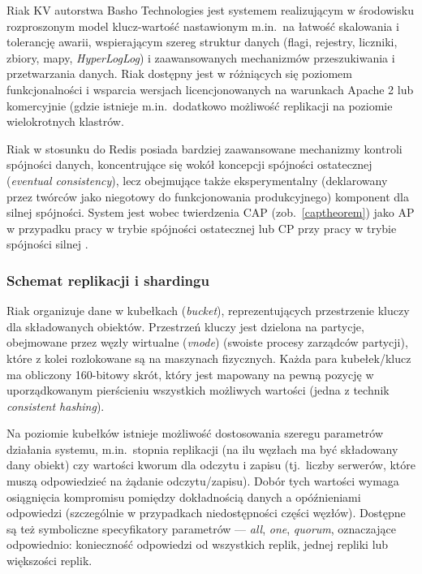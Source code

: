 Riak KV autorstwa Basho Technologies jest systemem realizującym w środowisku rozproszonym model
klucz-wartość nastawionym m.in.\ na łatwość skalowania i tolerancję awarii, wspierającym szereg
struktur danych (flagi, rejestry, liczniki, zbiory, mapy, \textit{HyperLogLog}) i zaawansowanych
mechanizmów przeszukiwania i przetwarzania danych. Riak dostępny jest w różniących się poziomem
funkcjonalności i wsparcia wersjach licencjonowanych na warunkach Apache 2 lub komercyjnie (gdzie
istnieje m.in.\ dodatkowo możliwość replikacji na poziomie wielokrotnych klastrów.

Riak w stosunku do Redis posiada bardziej zaawansowane mechanizmy kontroli spójności danych,
koncentrujące się wokół koncepcji spójności ostatecznej (\textit{eventual consistency}), lecz
obejmujące także eksperymentalny (deklarowany przez twórców jako niegotowy do funkcjonowania
produkcyjnego) komponent dla silnej spójności. System jest wobec twierdzenia CAP (zob.\ \ref{captheorem}) jako AP w przypadku pracy w trybie spójności ostatecznej lub CP przy pracy w trybie spójności silnej \cite{riakreplprop}.

\subsubsection*{Schemat replikacji i shardingu}

Riak organizuje dane w kubełkach (\textit{bucket}), reprezentujących przestrzenie kluczy dla składowanych obiektów. Przestrzeń kluczy jest dzielona na partycje, obejmowane przez węzły wirtualne (\textit{vnode}) (swoiste procesy zarządców partycji), które z kolei rozlokowane są na maszynach fizycznych. Każda para kubełek/klucz ma obliczony 160-bitowy skrót, który jest mapowany na pewną pozycję w uporządkowanym pierścieniu wszystkich możliwych wartości (jedna z technik \textit{consistent hashing}).

Na poziomie kubełków istnieje możliwość dostosowania szeregu parametrów działania systemu, m.in.\ 
stopnia replikacji (na ilu węzłach ma być składowany dany obiekt) czy wartości kworum dla odczytu i
zapisu (tj.\ liczby serwerów, które muszą odpowiedzieć na żądanie odczytu/zapisu). Dobór tych wartości wymaga osiągnięcia kompromisu pomiędzy dokładnością danych a opóźnieniami odpowiedzi (szczególnie w przypadkach niedostępności części węzłów). Dostępne są też symboliczne specyfikatory parametrów --- \textit{all}, \textit{one}, \textit{quorum}, oznaczające odpowiednio: konieczność odpowiedzi od wszystkich replik, jednej repliki lub większości replik.

